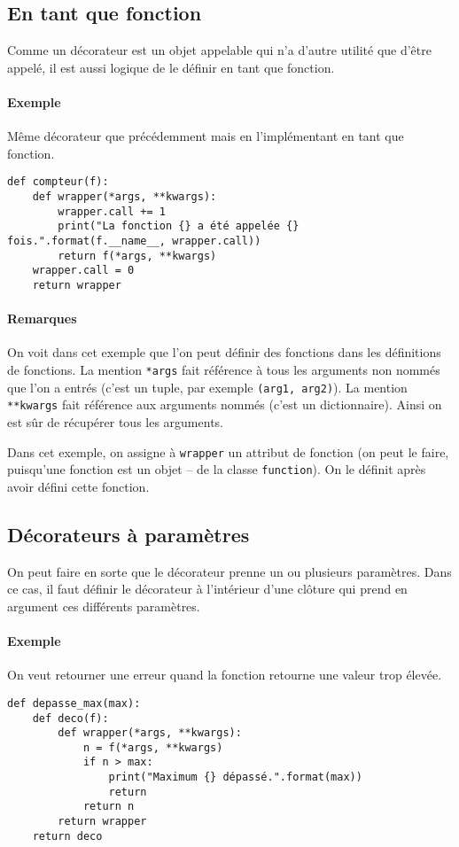 \subsection{En tant que fonction}
Comme un décorateur est un objet appelable qui n'a d'autre utilité que d'être appelé, il est aussi logique de le définir en tant que fonction.

\paragraph{Exemple} Même décorateur que précédemment mais en l'implémentant en tant que fonction.
\begin{verbatim}
def compteur(f):
    def wrapper(*args, **kwargs):
        wrapper.call += 1
        print("La fonction {} a été appelée {} fois.".format(f.__name__, wrapper.call))
        return f(*args, **kwargs)
    wrapper.call = 0
    return wrapper
\end{verbatim}

\paragraph{Remarques} On voit dans cet exemple que l'on peut définir des fonctions dans les définitions de fonctions. La mention \texttt{*args} fait référence à tous les arguments non nommés que l'on a entrés (c'est un tuple, par exemple \texttt{(arg1, arg2)}). La mention \texttt{**kwargs} fait référence aux arguments nommés (c'est un dictionnaire). Ainsi on est sûr de récupérer tous les arguments.\medskip

Dans cet exemple, on assigne à \texttt{wrapper} un attribut de fonction (on peut le faire, puisqu'une fonction est un objet -- de la classe \texttt{function}). On le définit après avoir défini cette fonction.

\subsection{Décorateurs à paramètres}
On peut faire en sorte que le décorateur prenne un ou plusieurs paramètres. Dans ce cas, il faut définir le décorateur à l'intérieur d'une clôture qui prend en argument ces différents paramètres.

\paragraph{Exemple} On veut retourner une erreur quand la fonction retourne une valeur trop élevée.
\begin{verbatim}
def depasse_max(max):
    def deco(f):
        def wrapper(*args, **kwargs):
            n = f(*args, **kwargs)
            if n > max:
                print("Maximum {} dépassé.".format(max))
                return
            return n
        return wrapper
    return deco
\end{verbatim}

